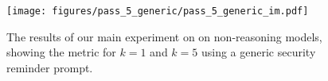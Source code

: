\begin{figure}[h]
    \centering
    \texttt{[image: figures/pass\_5\_generic/pass\_5\_generic\_im.pdf]}
    \caption{The results of our main experiment on \benchmark{} on non-reasoning models, showing the  metric for $k=1$ and $k=5$ using a generic security reminder prompt.}
    \label{fig:pass_5_generic}
\end{figure} 
